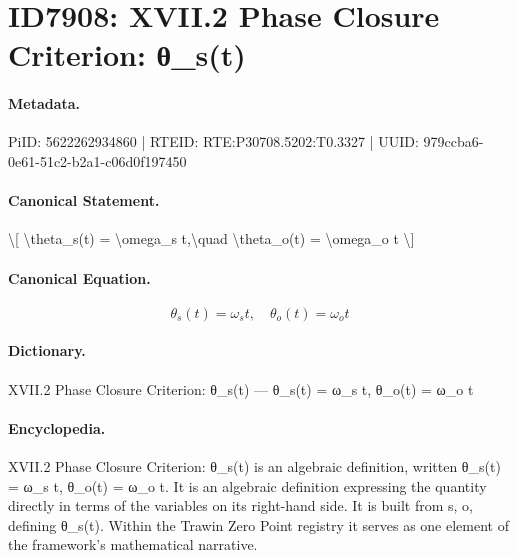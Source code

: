 \section*{ID7908: XVII.2 Phase Closure Criterion: θ\_s(t)}
\paragraph{Metadata.}
PiID: 5622262934860 | RTEID: RTE:P30708.5202:T0.3327 | UUID: 979ccba6-0e61-51c2-b2a1-c06d0f197450

\paragraph{Canonical Statement.}
\textbackslash{}[ \textbackslash{}theta\_s(t) = \textbackslash{}omega\_s t,\textbackslash{}quad \textbackslash{}theta\_o(t) = \textbackslash{}omega\_o t \textbackslash{}]

\paragraph{Canonical Equation.}
\[
\theta_s(t) = \omega_s t,\quad \theta_o(t) = \omega_o t
\]

\paragraph{Dictionary.}
XVII.2 Phase Closure Criterion: θ\_s(t) — θ\_s(t) = ω\_s t, θ\_o(t) = ω\_o t

\paragraph{Encyclopedia.}
XVII.2 Phase Closure Criterion: θ\_s(t) is an algebraic definition, written θ\_s(t) = ω\_s t, θ\_o(t) = ω\_o t. It is an algebraic definition expressing the quantity directly in terms of the variables on its right-hand side. It is built from s, o, defining θ\_s(t). Within the Trawin Zero Point registry it serves as one element of the framework's mathematical narrative.

